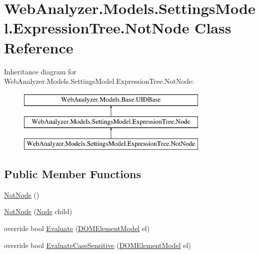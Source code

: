 \hypertarget{class_web_analyzer_1_1_models_1_1_settings_model_1_1_expression_tree_1_1_not_node}{}\section{Web\+Analyzer.\+Models.\+Settings\+Model.\+Expression\+Tree.\+Not\+Node Class Reference}
\label{class_web_analyzer_1_1_models_1_1_settings_model_1_1_expression_tree_1_1_not_node}
Inheritance diagram for Web\+Analyzer.\+Models.\+Settings\+Model.\+Expression\+Tree.\+Not\+Node\+:\begin{figure}[H]
\begin{center}
\leavevmode
\includegraphics[height=3.000000cm]{class_web_analyzer_1_1_models_1_1_settings_model_1_1_expression_tree_1_1_not_node}
\end{center}
\end{figure}
\subsection*{Public Member Functions}
\begin{DoxyCompactItemize}
\item 
\hyperlink{class_web_analyzer_1_1_models_1_1_settings_model_1_1_expression_tree_1_1_not_node_aa828446c9851f4a025c76b3943f5594b}{Not\+Node} ()
\item 
\hyperlink{class_web_analyzer_1_1_models_1_1_settings_model_1_1_expression_tree_1_1_not_node_a41d9d4ab20ba1cdc2b562937a98b7b03}{Not\+Node} (\hyperlink{class_web_analyzer_1_1_models_1_1_settings_model_1_1_expression_tree_1_1_node}{Node} child)
\item 
override bool \hyperlink{class_web_analyzer_1_1_models_1_1_settings_model_1_1_expression_tree_1_1_not_node_aa3794e368e151ff066abdfbdc5efb406}{Evaluate} (\hyperlink{class_web_analyzer_1_1_models_1_1_data_model_1_1_d_o_m_element_model}{D\+O\+M\+Element\+Model} el)
\item 
override bool \hyperlink{class_web_analyzer_1_1_models_1_1_settings_model_1_1_expression_tree_1_1_not_node_a188d7d9fe5ee7ceff3034b393ab8493b}{Evaluate\+Case\+Sensitive} (\hyperlink{class_web_analyzer_1_1_models_1_1_data_model_1_1_d_o_m_element_model}{D\+O\+M\+Element\+Model} el)
\end{DoxyCompactItemize}
